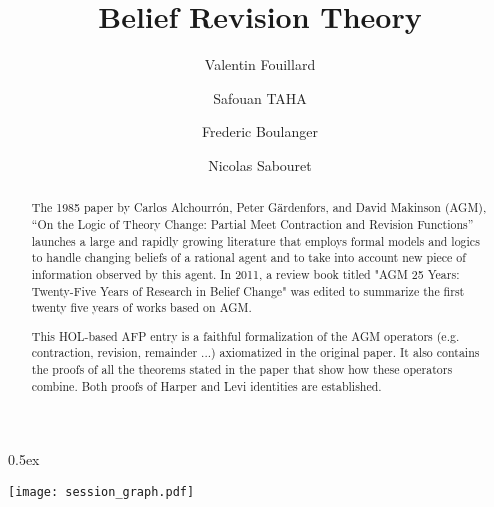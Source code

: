 \documentclass[11pt,a4paper]{article}
\begin{document}
\parindent 0pt\parskip 0.5ex

\title{Belief Revision Theory}
\author{ Valentin Fouillard \and Safouan TAHA \and Frederic Boulanger \and Nicolas Sabouret}
\maketitle

\newpage

\begin{abstract}
The 1985 paper by Carlos Alchourrón, Peter Gärdenfors,
and David Makinson (AGM), “On the Logic of Theory Change: Partial Meet Contraction and Revision Functions” launches a large and rapidly growing literature that employs formal models and logics to handle changing beliefs of a rational agent and to take into account new piece of information observed by this agent. In 2011, a review book titled "AGM 25 Years: Twenty-Five Years of Research in Belief Change" was edited to summarize the first twenty five years of works based on AGM.

This  HOL-based  AFP entry is a faithful formalization of the AGM operators (e.g. contraction, revision, remainder ...) axiomatized in the original paper. It also contains the proofs of all the theorems stated in the paper that show how these operators combine. Both proofs of Harper and Levi identities are established.
\end{abstract}

\newpage

\tableofcontents

\newpage

\texttt{[image: session\_graph.pdf]}

\newpage





\end{document}
